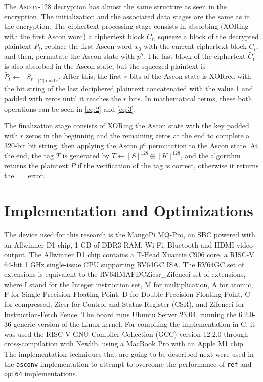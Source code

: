 \documentclass[11pt,twoside]{article}
\begin{document}
The \textsc{Ascon-128} decryption has almost the same structure as seen in the encryption. The initialization and the associated data stages are the same as in the encryption. The ciphertext processing stage consists in absorbing (XORing with the first Ascon word) a ciphertext block $C_i$, squeeze  a block of the decrypted plaintext $P_i$, replace the first Ascon word $x_0$ with the current ciphertext block $C_i$, and then, permutate the Ascon state with $p^b$. The last block of the ciphertext $\tilde{C_t}$ is also absorbed in the Ascon state, but the squeezed plaintext is $\tilde{P_t} \leftarrow {\left \lfloor  S_r \right \rfloor}_{|C| \ \textrm{mod} \ r}$. After this, the first $r$ bits of the Ascon state is XORred with the bit string of the last deciphered plaintext concatenated with the value 1 and padded with zeros until it reaches the $r$ bits. In mathematical terms, these both operations can be seen in \cref{eq:2} and \cref{eq:3}.

The finalization stage consists of XORing the Ascon state with the key padded with $r$ zeros in the beginning and the remaining zeros at the end to complete a 320-bit bit string, then applying the Ascon $p^a$ permutation to the Ascon state. At the end, the tag $T$ is generated by $T \leftarrow {\left \lceil  S \right \rceil}^{128} \oplus  {\left \lceil  K \right \rceil}^{128}$, and the algorithm returns the plaintext $P$ if the verification of the tag is correct, otherwise it returns the $\perp$ error.

\section{Implementation and Optimizations}

The device used for this research is the MangoPi MQ-Pro, an SBC powered with an Allwinner D1 chip, 1 GB of DDR3 RAM, Wi-Fi, Bluetooth and HDMI video output. The Allwinner D1 chip contains a T-Head Xuantie C906 core, a RISC-V 64-bit 1 GHz single-issue CPU supporting \textsf{RV64GC} ISA. The \textsf{RV64GC} set of extensions is equivalent to the \textsf{RV64IMAFDCZicsr\_Zifencei} set of extensions, where \textsf{I} stand for the Integer instruction set, \textsf{M} for multiplication, \textsf{A} for atomic, \textsf{F} for Single-Precision Floating-Point, \textsf{D} for Double-Precision Floating-Point, \textsf{C} for compressed, \textsf{Zicsr} for Control and Status Register (CSR), and \textsf{Zifencei} for Instruction-Fetch Fence. The board runs Ubuntu Server 23.04, running the 6.2.0-36-generic version of the Linux kernel. For compiling the implementation in C, it was used the RISC-V GNU Compiler Collection (GCC) version 12.2.0 \cite{riscvgnutoolchainv2023} through cross-compilation with Newlib, using a MacBook Pro with an Apple M1 chip. The implementation techniques that are going to be described next were used in the \texttt{asconv} implementation to attempt to overcome the performance of \texttt{ref} and \texttt{opt64} implementations.
\end{document}
